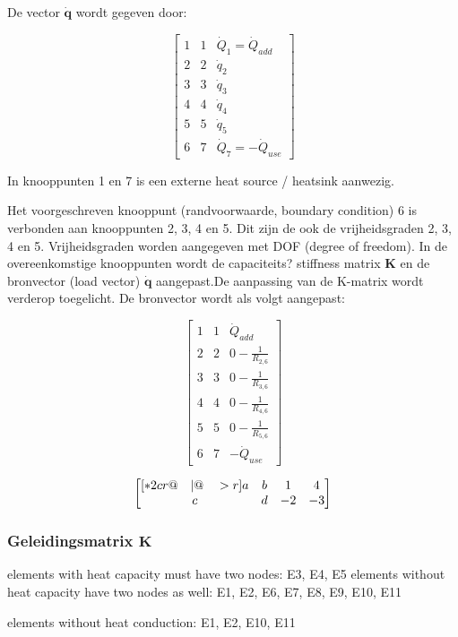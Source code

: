 De vector $\mathbf{\dot{q}}$ wordt gegeven door:

\[
\begin{bmatrix}
	1 & 1 & \dot{Q}_1 = \dot{Q}_{add}\\
	2 & 2 & \dot{q}_2\\
	3 & 3 & \dot{q}_3\\
	4 & 4 & \dot{q}_4\\
	5 & 5 & \dot{q}_5\\
	6 & 7 & \dot{Q}_7 = -\dot{Q}_{use}
\end{bmatrix}
\]

In knooppunten 1 en 7 is een externe heat source / heatsink aanwezig.

Het voorgeschreven knooppunt (randvoorwaarde, boundary condition) 6 is verbonden aan knooppunten 2, 3, 4 en 5. Dit zijn de ook de vrijheidsgraden 2, 3, 4 en 5. Vrijheidsgraden worden aangegeven met DOF (degree of freedom). In de overeenkomstige knooppunten wordt de capaciteits? stiffness matrix $\mathbf{K}$ en de bronvector (load vector) $\mathbf{\dot{q}}$ aangepast.De aanpassing van de K-matrix wordt verderop toegelicht. De bronvector wordt als volgt aangepast:

\[
\begin{bmatrix}
	1 & 1 & \dot{Q}_{add}\\
	2 & 2 & 0 - \frac{1}{R_{2,6}}\\
	3 & 3 & 0 - \frac{1}{R_{3,6}}\\
	4 & 4 & 0 - \frac{1}{R_{4,6}}\\
	5 & 5 & 0 - \frac{1}{R_{5,6}}\\
	6 & 7 & -\dot{Q}_{use}
\end{bmatrix}
\]

\[
\begin{bmatrix}[*2cr@{\quad}|@{\quad}>{\bf\color{red}}r]
	a & b & 1  &  4 \\
	c & d & -2 & -3
\end{bmatrix}
\]

\subsubsection{Geleidingsmatrix $\mathbf{K}$}

elements with heat capacity must have two nodes:
E3, E4, E5
elements without heat capacity have two nodes as well:
E1, E2, E6, E7, E8, E9, E10, E11

elements without heat conduction:
E1, E2, E10, E11

